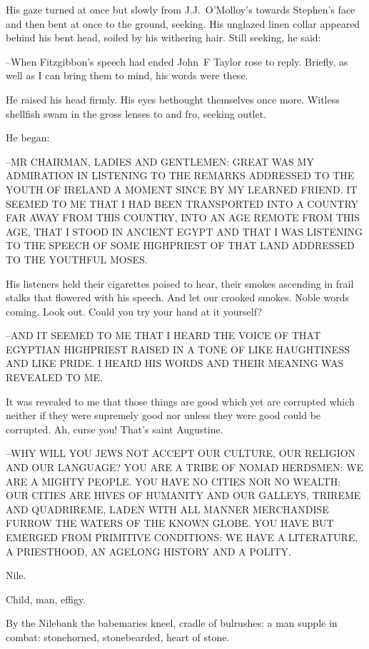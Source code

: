 His gaze turned at once but slowly from J.J.~O'Molloy's
towards Stephen's face
and then bent at once to the ground,
seeking.
His unglazed linen collar appeared behind his bent head,
soiled by his withering hair.
Still seeking,
he said:

--When Fitzgibbon's speech had ended
John~F Taylor rose to reply.
Briefly, as well as I can bring them to mind,
his words were these.

He raised his head firmly.
His eyes bethought themselves once more.
Witless shellfish swam in the gross lenses to and fro,
seeking outlet.

He began:

--MR CHAIRMAN, LADIES AND GENTLEMEN:
GREAT WAS MY ADMIRATION IN LISTENING
TO THE REMARKS ADDRESSED TO THE YOUTH OF IRELAND A MOMENT SINCE
BY MY LEARNED FRIEND.
IT SEEMED TO ME
THAT I HAD BEEN TRANSPORTED INTO A COUNTRY FAR AWAY FROM THIS COUNTRY,
INTO AN AGE REMOTE FROM THIS AGE,
THAT I STOOD IN ANCIENT EGYPT
AND THAT I WAS LISTENING TO THE SPEECH OF SOME HIGHPRIEST OF THAT LAND
ADDRESSED TO THE YOUTHFUL MOSES.

His listeners held their cigarettes poised to hear,
their smokes ascending in frail stalks that flowered with his speech.
And let our crooked smokes.
Noble words coming.
Look out.
Could you try your hand at it yourself?

--AND IT SEEMED TO ME
THAT I HEARD THE VOICE OF THAT EGYPTIAN HIGHPRIEST
RAISED IN A TONE OF LIKE HAUGHTINESS AND LIKE PRIDE.
I HEARD HIS WORDS AND THEIR MEANING WAS REVEALED TO ME.



It was revealed to me
that those things are good which yet are corrupted
which neither if they were supremely good
nor unless they were good could be corrupted.
Ah, curse you!
That's saint Augustine.

--WHY WILL YOU JEWS NOT ACCEPT
OUR CULTURE, OUR RELIGION AND OUR LANGUAGE?
YOU ARE A TRIBE OF NOMAD HERDSMEN:
WE ARE A MIGHTY PEOPLE.
YOU HAVE NO CITIES NOR NO WEALTH:
OUR CITIES ARE HIVES OF HUMANITY
AND OUR GALLEYS, TRIREME AND  QUADRIREME,
LADEN WITH ALL MANNER MERCHANDISE FURROW
THE WATERS OF THE KNOWN GLOBE.
YOU HAVE BUT EMERGED FROM PRIMITIVE CONDITIONS:
WE HAVE A LITERATURE, A PRIESTHOOD, AN AGELONG HISTORY AND A POLITY.

Nile.

Child,
man,
effigy.

By the Nilebank
the babemaries kneel,
cradle of bulrushes:
a man supple in combat:
stonehorned,
stonebearded,
heart of stone.

